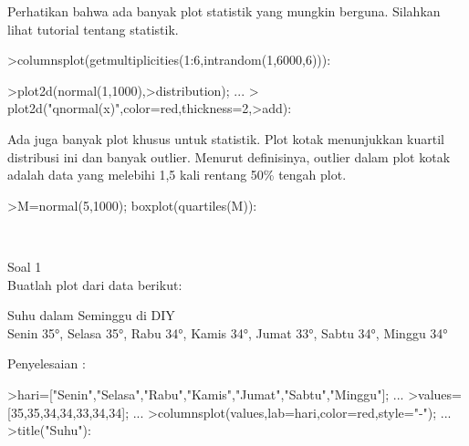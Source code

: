 \begin{eulernotebook}
\begin{eulerprompt}
\end{eulerprompt}
\begin{eulercomment}
Perhatikan bahwa ada banyak plot statistik yang mungkin berguna.
Silahkan lihat tutorial tentang statistik.
\end{eulercomment}
\begin{eulerprompt}
>columnsplot(getmultiplicities(1:6,intrandom(1,6000,6))):
\end{eulerprompt}
\begin{eulerprompt}
>plot2d(normal(1,1000),>distribution); ...
>  plot2d("qnormal(x)",color=red,thickness=2,>add):
\end{eulerprompt}
\begin{eulercomment}
Ada juga banyak plot khusus untuk statistik. Plot kotak menunjukkan
kuartil distribusi ini dan banyak outlier. Menurut definisinya,
outlier dalam plot kotak adalah data yang melebihi 1,5 kali rentang
50\% tengah plot.
\end{eulercomment}
\begin{eulerprompt}
>M=normal(5,1000); boxplot(quartiles(M)):
\end{eulerprompt}
\begin{eulercomment}
\\

\end{eulercomment}
\begin{eulercomment}
Soal 1\\
Buatlah plot dari data berikut:

Suhu dalam Seminggu di DIY\\
Senin 35°, Selasa 35°, Rabu 34°, Kamis 34°, Jumat 33°, Sabtu 34°,
Minggu 34°

Penyelesaian :
\end{eulercomment}
\begin{eulerprompt}
>hari=["Senin","Selasa","Rabu","Kamis","Jumat","Sabtu","Minggu"]; ...
>values=[35,35,34,34,33,34,34]; ...
>columnsplot(values,lab=hari,color=red,style="-"); ...
>title("Suhu"):
\end{eulerprompt}
\\


\end{eulernotebook}

